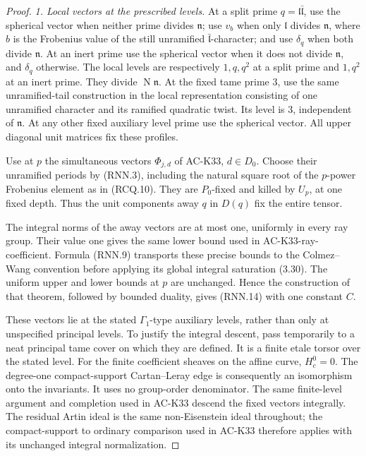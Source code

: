 \begin{proof}
\emph{1. Local vectors at the prescribed levels.}
At a split prime \(q=\mathfrak l\bar{\mathfrak l}\), use the
spherical vector when neither prime divides \(\mathfrak n\);
use \(v_b\) when only \(\mathfrak l\) divides \(\mathfrak n\),
where \(b\) is the Frobenius value of the still unramified
\(\bar{\mathfrak l}\)-character; and use \(\delta_q\) when
both divide \(\mathfrak n\).
At an inert prime use the spherical vector when it does not
divide \(\mathfrak n\), and \(\delta_q\) otherwise.
The local levels are respectively \(1,q,q^2\) at a split
prime and \(1,q^2\) at an inert prime.  They divide
\(\operatorname N\mathfrak n\).
At the fixed tame prime \(3\), use the same unramified-tail
construction in the local representation consisting of one
unramified character and its ramified quadratic twist.
Its level is \(3\), independent of \(\mathfrak n\).
At any other fixed auxiliary level prime use the spherical
vector.  All upper diagonal unit matrices fix these profiles.

Use at \(p\) the simultaneous vectors \(\Phi_{j,d}\) of
AC-K33, \(d\in D_0\).  Choose their unramified periods by
(RNN.3), including the natural square root of the \(p\)-power
Frobenius element as in (RCQ.10).
They are \(P_0\)-fixed and killed by \(U_p\), at one fixed
depth.  Thus the unit components away \(q\) in \(D(q)\)
fix the entire tensor.

The integral norms of the away vectors are at most one,
uniformly in every ray group.  Their value one gives the
same lower bound used in AC-K33-ray-coefficient.
Formula (RNN.9) transports these precise bounds to the
Colmez--Wang convention before applying its global integral
saturation (3.30).
The uniform upper and lower bounds at \(p\) are unchanged.
Hence the construction of that theorem, followed by bounded
duality, gives (RNN.14) with one constant \(C\).

These vectors lie at the stated \(\Gamma_1\)-type auxiliary
levels, rather than only at unspecified principal levels.
To justify the integral descent, pass temporarily to a neat
principal tame cover on which they are defined.
It is a finite etale torsor over the stated level.
For the finite coefficient sheaves on the affine curve,
\(H_c^0=0\).  The degree-one compact-support Cartan--Leray
edge is consequently an isomorphism onto the invariants.
It uses no group-order denominator.
The same finite-level argument and completion used in
AC-K33 descend the fixed vectors integrally.
The residual Artin ideal is the same non-Eisenstein ideal
throughout; the compact-support to ordinary comparison used
in AC-K33 therefore applies with its unchanged integral
normalization.


\end{proof}
